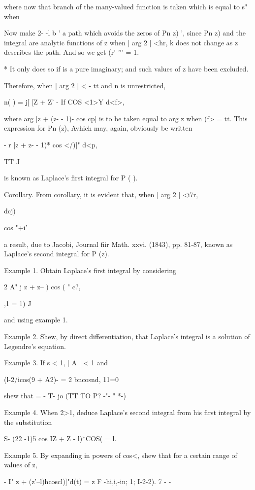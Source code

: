 {{where now that branch of the many-valued function is taken which is
equal to s" when

Now make 2- -l b ' a path which avoids the zeros of Pn z) ', since Pn
z) and the integral are analytic functions of z when | arg 2 | <hr, k
does not change as z describes the path. And so we get (r' ''' = 1.

* It only does so if is a pure imaginary; and such values of z have
been excluded.

%
%

Therefore, when | arg 2 | < - tt and n is unrestricted,

 n( ) = j[ [Z + Z' - If COS <1>Y d<f>,

where arg [z + (z- - 1)- cos cp] is to be taken equal to arg z when
(f> = tt. This expression for Pn (z), Avhich may, again, obviously be
written

- r [z + z- - 1)* cos </)]" d<p,

TT J

is known as Laplace's first integral for P ( ).

Corollary. From corollary, it is evident that, when | arg 2 |
<i7r,

dcj)

 cos "+i'

a result, due to Jacobi, Journal fiir Math. xxvi. (1843), pp. 81-87,
known as Laplace's second integral for P (z).

Example 1. Obtain Laplace's first integral by considering

2 A" j z + z-- ) cos ( " c?,

,1 = 1) J

and using example 1.

Example 2. Shew, by direct differentiation, that Laplace's integral is
a solution of Legendre's equation.

Example 3. If s < 1, | A | < 1 and

(l-2/icos(9 + A2)- = 2 bncosnd, 11=0

shew that = - T- jo (TT TO P? -"- " *-)

Example 4. When 2>1, deduce Laplace's second integral from his first
integral by the substitution

 S- (22 -1)5 cos IZ + Z - l)*COS( = l.

Example 5. By expanding in powers of cos<, shew that for a certain
range of values of z,

- I" z + (z'--l)hcoscl)]"d(t) = z F -hi,i,-in; 1; I-2-2). 7  - -

}}
